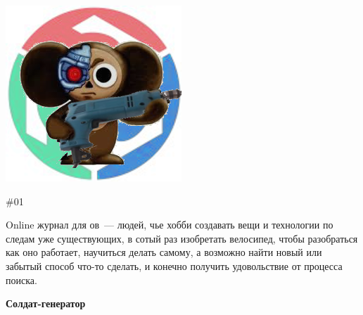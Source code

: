 
\begin{titlepage}

\begin{multicols}{2}

\noindent\includegraphics[width=0.9\columnwidth]{logo/chbz.png}

\columnbreak

{\Huge \Scr \#01}\bigskip

\noindent\textsf{Online журнал для \scr ов\ --- людей, чье хобби создавать вещи
и технологии по следам уже существующих, в сотый раз изобретать велосипед, чтобы
разобраться как оно работает, научиться делать самому, а возможно найти новый
или забытый способ что-то сделать, и конечно получить удовольствие от процесса
поиска.}

\end{multicols}

\begin{center}
{\Huge\textbf{Солдат-генератор}}
{\large\bigskip}
\end{center}


\end{titlepage}
